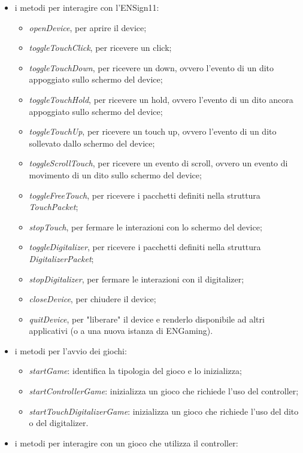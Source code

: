 \begin{itemize}
    \item i metodi per interagire con l'ENSign11: \begin{itemize}
        \item \emph{openDevice}, per aprire il device;
        \item \emph{toggleTouchClick}, per ricevere un click;
        \item \emph{toggleTouchDown}, per ricevere un down, ovvero l'evento di un dito appoggiato sullo schermo del device;
        \item \emph{toggleTouchHold}, per ricevere un hold, ovvero l'evento di un dito ancora appoggiato sullo schermo del device;
        \item \emph{toggleTouchUp}, per ricevere un touch up, ovvero l'evento di un dito sollevato dallo schermo del device;
        \item \emph{toggleScrollTouch}, per ricevere un evento di scroll, ovvero un evento di movimento di un dito sullo schermo del device;
        \item \emph{toggleFreeTouch}, per ricevere i pacchetti definiti nella struttura \emph{TouchPacket};
        \item \emph{stopTouch}, per fermare le interazioni con lo schermo del device;
        \item \emph{toggleDigitalizer}, per ricevere i pacchetti definiti nella struttura \emph{DigitalizerPacket};
        \item \emph{stopDigitalizer}, per fermare le interazioni con il digitalizer;
        \item \emph{closeDevice}, per chiudere il device;
        \item \emph{quitDevice}, per "liberare" il device e renderlo disponibile ad altri applicativi (o a una nuova istanza di ENGaming).
    \end{itemize}
    \item i metodi per l'avvio dei giochi: \begin{itemize}
        \item \emph{startGame}: identifica la tipologia del gioco e lo inizializza;
        \item \emph{startControllerGame}: inizializza un gioco che richiede l'uso del controller;
        \item \emph{startTouchDigitalizerGame}: inizializza un gioco che richiede l'uso del dito o del digitalizer.
    \end{itemize}
    \item i metodi per interagire con un gioco che utilizza il controller: \begin{itemize}

\end{itemize}
\end{itemize}

